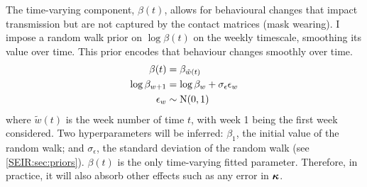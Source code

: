 \documentclass[thesis.tex]{subfiles}
\begin{document}
The time-varying component, $\beta(t)$, allows for behavioural changes that impact transmission but are not captured by the contact matrices (\eg mask wearing).
I impose a random walk prior on $\log\beta(t)$ on the weekly timescale, smoothing its value over time.
This prior encodes that behaviour changes smoothly over time.
\begin{align}
    \beta(t) &= \beta_{\tilde{w}(t)} \\
    \log\beta_{w+1} &= \log\beta_w + \sigma_\epsilon \epsilon_w \\
    \epsilon_w &\sim \operatorname{N}(0, 1)
\end{align}
where $\tilde{w}(t)$ is the week number of time $t$, with week 1 being the first week considered.
Two hyperparameters will be inferred: $\beta_1$, the initial value of the random walk; and $\sigma_\epsilon$, the standard deviation of the random walk (see \cref{SEIR:sec:priors}).
$\beta(t)$ is the only time-varying fitted parameter.
Therefore, in practice, it will also absorb other effects such as any error in $\bm{\kappa}$.


\end{document}
